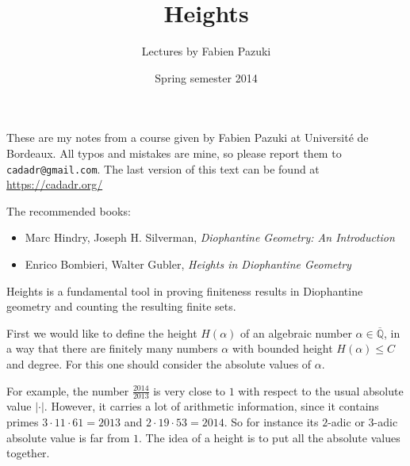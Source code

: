\documentclass{article}
\title{Heights}
\author{Lectures by Fabien Pazuki}
\date{Spring semester 2014}
\newcommand{\refref}[2]{\hyperref[#2]{#1 \ref*{#2}}}
\theoremstyle{definition}
\newcommand{\QQ}{\mathbb{Q}}
\begin{document}
\maketitle

\noindent These are my notes from a course given by Fabien Pazuki at
Universit\'e de Bordeaux.
All typos and mistakes are mine, so please report them to
\texttt{cadadr@gmail.com}.
The last version of this text can be found at \url{https://cadadr.org/}

\vspace{1em}

The recommended books:

\begin{itemize}
\item Marc Hindry, Joseph H. Silverman,
  \emph{Diophantine Geometry: An Introduction}

\item Enrico Bombieri, Walter Gubler, \emph{Heights in Diophantine Geometry}
\end{itemize}

\tableofcontents

\vspace{1em}

Heights is a fundamental tool in proving finiteness results in Diophantine
geometry and counting the resulting finite sets.

First we would like to define the height $H (\alpha)$ of an algebraic number
$\alpha \in \overline{\QQ}$, in a way that there are finitely many numbers
$\alpha$ with bounded height $H (\alpha) \le C$ and degree. For this one should
consider the absolute values of $\alpha$.

For example, the number $\frac{2014}{2013}$ is very close to $1$ with respect to
the usual absolute value $|\cdot|$. However, it carries a lot of arithmetic
information, since it contains primes $3\cdot 11\cdot 61 = 2013$ and
$2\cdot 19\cdot 53 = 2014$. So for instance its $2$-adic or $3$-adic absolute
value is far from $1$. The idea of a height is to put all the absolute values
together.
\end{document}
